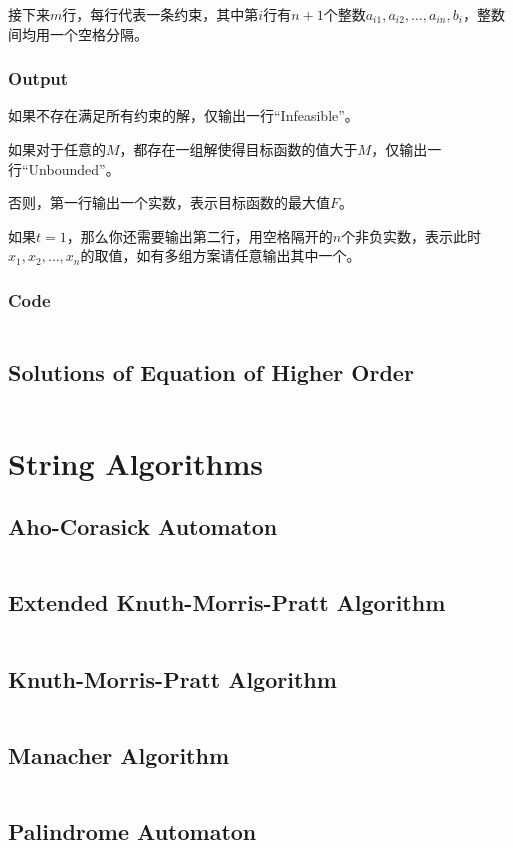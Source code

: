 \documentclass[a4paper,openany]{book}
\newcommand{\cppcode}[1]
{
  \inputminted[mathescape,
  tabsize=4,
  linenos,
  framesep=2mm,
  breakaftergroup=true,
  breakautoindent=true,
  breakbytoken=true,
  breaklines=true,
  fontsize=\small
  ]{cpp}{Source/#1}
}
\begin{document}
接下来$m$行，每行代表一条约束，其中第$i$行有$n+1$个整数$a_{i1},a_{i2},\ldots,a_{in},b_i$，整数间均用一个空格分隔。
\subsection{Output}
如果不存在满足所有约束的解，仅输出一行``Infeasible''。

如果对于任意的$M$，都存在一组解使得目标函数的值大于$M$，仅输出一行``Unbounded''。

否则，第一行输出一个实数，表示目标函数的最大值$F$。

如果$t=1$，那么你还需要输出第二行，用空格隔开的$n$个非负实数，表示此时$x_1,x_2,\ldots,x_n$的取值，如有多组方案请任意输出其中一个。
\subsection{Code}
\cppcode{/Numerical Algorithms/Simplex.cpp}
\section{Solutions of Equation of Higher Order}
\cppcode{/Numerical Algorithms/Solutions of Equation of Higher Order.cpp}

\chapter{String Algorithms}
\section{Aho-Corasick Automaton}
\cppcode{/String Algorithms/Aho-Corasick Automaton.cpp}
\section{Extended Knuth-Morris-Pratt Algorithm}
\cppcode{/String Algorithms/Extended Knuth-Morris-Pratt Algorithm.cpp}
\section{Knuth-Morris-Pratt Algorithm}
\cppcode{/String Algorithms/Knuth-Morris-Pratt Algorithm.cpp}
\section{Manacher Algorithm}
\cppcode{/String Algorithms/Manacher Algorithm.cpp}
\section{Palindrome Automaton}
\cppcode{/String Algorithms/Palindrome Automaton.cpp}
\end{document}

